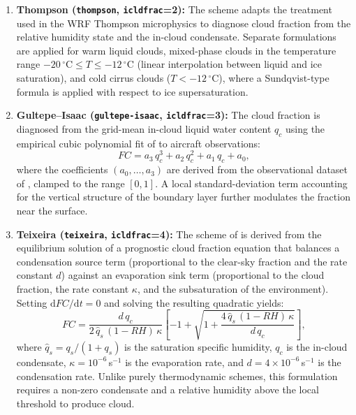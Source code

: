 {{\begin{enumerate}
\item {\bf Thompson (\texttt{thompson}, \texttt{icldfrac}=2):} The scheme adapts the treatment
used in the WRF Thompson microphysics \citep{Thompson_08} to diagnose cloud
fraction from the relative humidity state and the in-cloud condensate.
Separate formulations are applied for warm liquid clouds, mixed-phase clouds
in the temperature range $-20\,^\circ\mathrm{C} \leq T \leq
-12\,^\circ\mathrm{C}$ (linear interpolation between liquid and ice
saturation), and cold cirrus clouds ($T < -12\,^\circ\mathrm{C}$), where a
Sundqvist-type formula is applied with respect to ice supersaturation.\\

\item {\bf Gultepe--Isaac (\texttt{gultepe-isaac}, \texttt{icldfrac}=3):} The cloud fraction is
diagnosed from the grid-mean in-cloud liquid water content $q_c$ using the
empirical cubic polynomial fit of \citet{GultepeIsaac_07} to aircraft
observations:
\begin{equation}
  FC = a_3\,q_c^3 + a_2\,q_c^2 + a_1\,q_c + a_0,
\end{equation}
where the coefficients $(a_0,\ldots,a_3)$ are derived from the observational
dataset of \citet{Gultepe_97}, clamped to the range $[0,1]$. A local
standard-deviation term accounting for the vertical structure of the boundary
layer further modulates the fraction near the surface.\\

\item {\bf Teixeira (\texttt{teixeira}, \texttt{icldfrac}=4):} The scheme of \citet{Teixeira_01}
is derived from the equilibrium solution of a prognostic cloud fraction
equation that balances a condensation source term (proportional to the
clear-sky fraction and the rate constant $d$) against an evaporation sink term
(proportional to the cloud fraction, the rate constant $\kappa$, and the
subsaturation of the environment). Setting $\mathrm{d}FC/\mathrm{d}t = 0$
and solving the resulting quadratic yields:
\begin{equation}
  FC = \frac{d\,q_c}{2\,\hat{q}_s\,(1-RH)\,\kappa}
       \left[-1 + \sqrt{1 + \frac{4\,\hat{q}_s\,(1-RH)\,\kappa}
       {d\,q_c}}\right],
\end{equation}
where $\hat{q}_s = q_s/(1+q_s)$ is the saturation specific humidity,
$q_c$ is the in-cloud condensate, $\kappa = 10^{-6}$\,s$^{-1}$ is the
evaporation rate, and $d = 4 \times 10^{-6}$\,s$^{-1}$ is the condensation
rate. Unlike purely thermodynamic schemes, this formulation requires a
non-zero condensate and a relative humidity above the local threshold to
produce cloud.\\


\end{enumerate}}}
